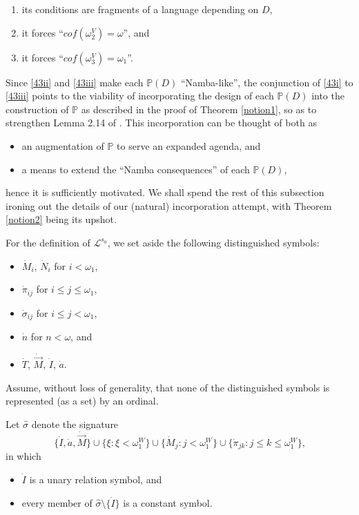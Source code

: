 \documentclass[12pt]{article}
\numberwithin{equation}{section}
\begin{document}
\begin{enumerate}[label=(\roman*)]
    \item\label{43i} its conditions are fragments of a language depending on $D$,
    \item\label{43ii} it forces ``$cof(\omega_2^V) = \omega$'', and
    \item\label{43iii} it forces ``$cof(\omega_3^V) = \omega_1$''.
\end{enumerate}
Since \ref{43ii} and \ref{43iii} make each $\mathbb{P}(D)$ ``Namba-like'', the conjunction of \ref{43i} to \ref{43iii} points to the viability of incorporating the design of each $\mathbb{P}(D)$ into the construction of $\mathbb{P}$ as described in the proof of Theorem \ref{notion1}, so as to strengthen Lemma 2.14 of \cite{schindler}. This incorporation can be thought of both as
\begin{itemize}
    \item an augmentation of $\mathbb{P}$ to serve an expanded agenda, and
    \item a means to extend the ``Namba consequences'' of each $\mathbb{P}(D)$,
\end{itemize}
hence it is sufficiently motivated. We shall spend the rest of this subsection ironing out the details of our (natural) incorporation attempt, with Theorem \ref{notion2} being its upshot.

\begin{defi}\label{defl2}
For the definition of $\mathcal{L}^{s_0}$, we set aside the following distinguished symbols:
\begin{itemize}
    \item $\dot{M}_i$, $\dot{N}_i$ for $i < \omega_1$,
    \item $\dot{\pi}_{ij}$ for $i \leq j \leq \omega_1$,
    \item $\dot{\sigma}_{ij}$ for $i \leq j < \omega_1$,
    \item $\dot{n}$ for $n < \omega$, and
    \item $\dot{T}$, $\dot{\Vec{M}}$, $\dot{I}$, $\dot{a}$.
\end{itemize}
Assume, without loss of generality, that none of the distinguished symbols is represented (as a set) by an ordinal.
\end{defi}

\begin{defi}
Let $\hat{\sigma}$ denote the signature
\begin{equation*}
    \{\dot{I}, \dot{a}, \dot{\Vec{M}}\} \cup \{\xi : \xi < \omega_1^W\} \cup \{\dot{M}_j : j < \omega_1^W\} \cup \{\dot{\pi}_{jk} : j \leq k \leq \omega_1^W\} \text{,}
\end{equation*}
in which
\begin{itemize}
    \item $\dot{I}$ is a unary relation symbol, and
    \item every member of $\hat{\sigma} \setminus \{\dot{I}\}$ is a constant symbol.
\end{itemize}
\end{defi}
\end{document}
